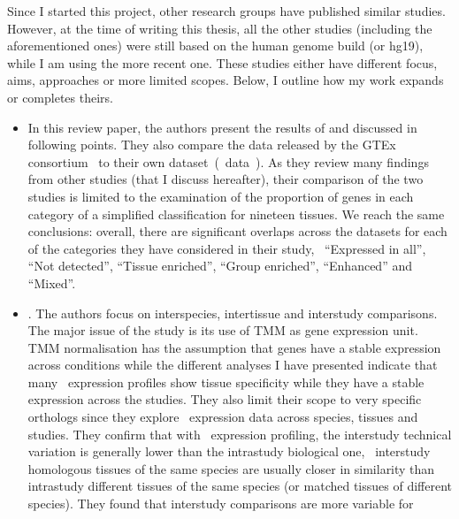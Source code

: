 Since I started this project,
other research groups have published similar studies.
However, at the time of writing this thesis,
all the other studies (including the aforementioned ones)
were still based on the human genome build  (or hg19),
while I am using the more recent  one.
These studies either have different focus, aims,
approaches or more limited scopes.
Below, I outline how my work expands or completes theirs.
\begin{itemize}[topsep=0pt,nosep]
\item\hspace{-1mm} In this review paper,
the authors present the results of \citet{Yu2015-uh} and \citet{Danielsson2015-cn}
discussed in following points.
They also compare the data released by the \gls{GTEx} consortium~
to their own dataset~(\uhlen\ data~).
As they review many findings from other studies (that I discuss hereafter),
their comparison of the two studies is
limited to the examination of
the proportion of genes in each category of a simplified classification
for nineteen tissues.
We reach the same conclusions:
overall, there are significant overlaps across the datasets for each of the
categories they have considered in their study, \ie\ \enquote{Expressed in all},
\enquote{Not detected}, \enquote{Tissue enriched}, \enquote{Group enriched},
\enquote{Enhanced} and \enquote{Mixed}.
\item\hspace{-1mm}.
The authors focus on interspecies, intertissue and interstudy comparisons.
The major issue of the study is its use of \gls{TMM} as gene expression unit.
\gls{TMM} normalisation has the assumption that
genes have a stable expression across conditions while the different analyses
I have presented indicate that many \pcgs\ expression profiles show tissue
specificity while they have a stable expression across the studies.
They also limit their scope to very specific orthologs
since they explore \Rnaseq\ expression data across species, tissues and studies.
They confirm that with \Rnaseq\ expression profiling,
the interstudy technical variation is generally lower than
the intrastudy biological one, \ie\
interstudy homologous tissues of the same species are usually
closer in similarity than intrastudy different tissues of the same species
(or matched tissues of different species).
They found that interstudy comparisons are more variable for 

\end{itemize}
